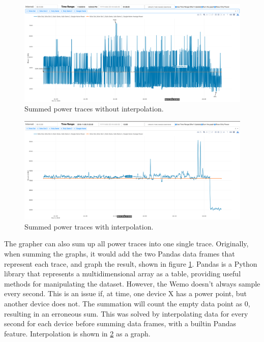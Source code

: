 \begin{figure}[H]
    \centering
    \includegraphics[width=1\textwidth]{figures/noninterpolated.png}
    \caption{Summed power traces without interpolation.}
    \label{fig:noninterpolated}
\end{figure}

\begin{figure}[H]
    \centering
    \includegraphics[width=1\textwidth]{figures/interpolated.png}
    \caption{Summed power traces with interpolation.}
    \label{fig:interpolated}
\end{figure}

The grapher can also sum up all power traces into one single trace. Originally, when summing the graphs, it would add the two Pandas \cite{pandas} data frames that represent each trace, and graph the result, shown in figure \ref{fig:noninterpolated}. Pandas is a Python library that represents a multidimensional array as a table, providing useful methods for manipulating the dataset. However, the Wemo doesn't always sample every second. This is an issue if, at time, one device X has a power point, but another device does not. The summation will count the empty data point as 0, resulting in an erroneous sum. This was solved by interpolating data for every second for each device before summing data frames, with a builtin Pandas feature. Interpolation is shown in \ref{fig:interpolated} as a graph.

